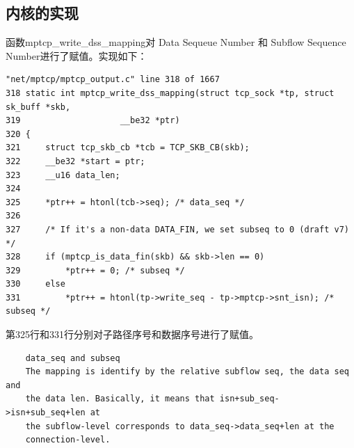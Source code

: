 \subsection{内核的实现}
函数mptcp\_write\_dss\_mapping对 Data Sequeue Number  和  Subflow Sequence Number进行了赋值。实现如下：
\small\begin{verbatim}
"net/mptcp/mptcp_output.c" line 318 of 1667
318 static int mptcp_write_dss_mapping(struct tcp_sock *tp, struct sk_buff *skb,
319                    __be32 *ptr)
320 {
321     struct tcp_skb_cb *tcb = TCP_SKB_CB(skb);
322     __be32 *start = ptr;
323     __u16 data_len;
324
325     *ptr++ = htonl(tcb->seq); /* data_seq */
326
327     /* If it's a non-data DATA_FIN, we set subseq to 0 (draft v7) */
328     if (mptcp_is_data_fin(skb) && skb->len == 0)
329         *ptr++ = 0; /* subseq */
330     else
331         *ptr++ = htonl(tp->write_seq - tp->mptcp->snt_isn); /* subseq */
\end{verbatim}\normalsize
第325行和331行分别对子路径序号和数据序号进行了赋值。
\small\begin{verbatim}
    data_seq and subseq
    The mapping is identify by the relative subflow seq, the data seq and
    the data len. Basically, it means that isn+sub_seq->isn+sub_seq+len at
    the subflow-level corresponds to data_seq->data_seq+len at the
    connection-level.
\end{verbatim}\normalsize
